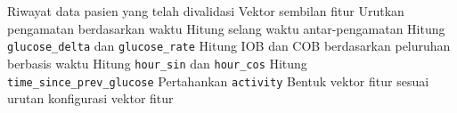 \begin{algorithm}[!htbp]
    \caption{Rekayasa Fitur Modul Prediksi}
    \label{alg:alg5.1_rekayasa_fitur_modul_prediksi}
    \begin{algorithmic}[1]
        \Require Riwayat data pasien yang telah divalidasi
        \Ensure Vektor sembilan fitur
        \State Urutkan pengamatan berdasarkan waktu
        \State Hitung selang waktu antar-pengamatan
        \State Hitung \texttt{glucose\_delta} dan \texttt{glucose\_rate}
        \State Hitung IOB dan COB berdasarkan peluruhan berbasis waktu
        \State Hitung \texttt{hour\_sin} dan \texttt{hour\_cos}
        \State Hitung \texttt{time\_since\_prev\_glucose}
        \State Pertahankan \texttt{activity}
        \State Bentuk vektor fitur sesuai urutan konfigurasi
        \State \Return vektor fitur
    \end{algorithmic}
\end{algorithm}
